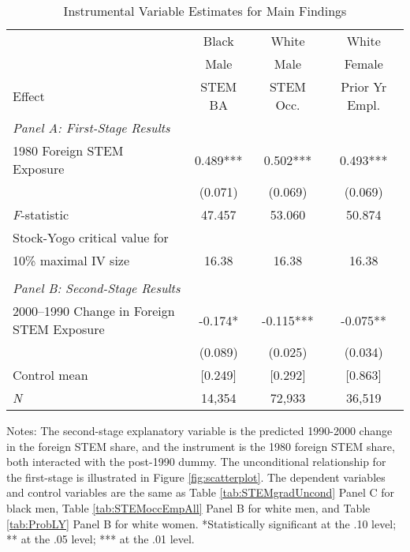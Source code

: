 \begin{table}[ht]
\caption{Instrumental Variable Estimates for Main Findings}
\label{tab:tallIV}
\centering
\begin{threeparttable}
\begin{tabular}{lccc}
\toprule 
       & Black           & White        & White       \\
       & Male            & Male         & Female      \\
Effect & STEM BA         & STEM Occ.    & Prior Yr Empl.\\
\midrule 
\multicolumn{4}{l}{\emph{Panel A: First-Stage Results}}\\ 
1980 Foreign STEM Exposure & 0.489*** & 0.502*** & 0.493*** \\ 
      &  (0.071)        & (0.069)        & (0.069) \\ 
\midrule 
\emph{F}-statistic      &   47.457          &  53.060          &  50.874 \\ 
Stock-Yogo critical value for    &                              &                              &\\
10\% maximal IV size             &  16.38        & 16.38        & 16.38 \\ 
\midrule 
                         &                              &                              &\\
\multicolumn{4}{l}{\emph{Panel B: Second-Stage Results}}\\ 
2000--1990 Change in Foreign STEM Exposure & -0.174* & -0.115*** & -0.075** \\ 
 &  (0.089)        & (0.025)        & (0.034) \\ 
Control mean &  [0.249]        & [0.292]       & [0.863] \\ 
\emph{N} &     14,354          &    72,933          &    36,519 \\ 
\bottomrule 
\end{tabular} 
\footnotesize Notes: The second-stage explanatory variable is the predicted 1990-2000 change in the foreign STEM share, and the instrument is the 1980 foreign STEM share, both interacted with the post-1990 dummy. The unconditional relationship for the first-stage is illustrated in Figure \ref{fig:scatterplot}. The dependent variables and control variables are the same as Table \ref{tab:STEMgradUncond} Panel C for black men, Table \ref{tab:STEMoccEmpAll} Panel B for white men, and Table \ref{tab:ProbLY} Panel B for white women. *Statistically significant at the .10 level; ** at the .05 level; *** at the .01 level.
\end{threeparttable} 
\end{table} 
